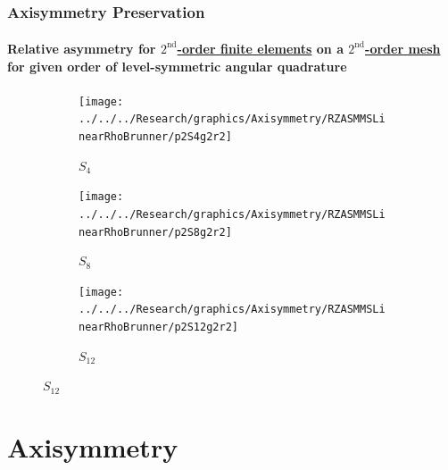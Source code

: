 \documentclass[compress,t]{beamer}
\begin{document}
\subsection{}

\begin{frame}
\frametitle{Axisymmetry Preservation}
\framesubtitle{Relative asymmetry for \underline{$2^\text{nd}$-order finite elements} on a \underline{$2^\text{nd}$-order mesh} for given order of level-symmetric angular quadrature}

\begin{figure}
\centering
\begin{subfigure}{0.33\textwidth}
\centering
\texttt{[image: ../../../Research/graphics/Axisymmetry/RZASMMSLinearRhoBrunner/p2S4g2r2]}
\caption{$S_4$}
\end{subfigure}%
\begin{subfigure}{0.33\textwidth}
\centering
\texttt{[image: ../../../Research/graphics/Axisymmetry/RZASMMSLinearRhoBrunner/p2S8g2r2]}
\caption{$S_8$}
\end{subfigure}%
\begin{subfigure}{0.33\textwidth}
\centering
\texttt{[image: ../../../Research/graphics/Axisymmetry/RZASMMSLinearRhoBrunner/p2S12g2r2]}
\caption{$S_{12}$}
\end{subfigure}
\end{figure}

\end{frame}

\section{Axisymmetry}
\subsection{}
\end{document}

